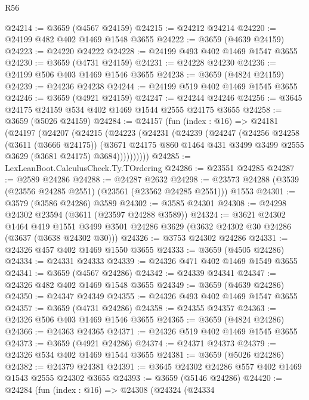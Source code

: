 \begin{lexlean}{R56}
\begin{coremodule}
@24214 := @3659 (@4567 @24159)
@24215 := @24212 @24214
@24220 := @24199 @482 @402 @1469 @1548 @3655
@24222 := @3659 (@4639 @24159)
@24223 := @24220 @24222
@24228 := @24199 @493 @402 @1469 @1547 @3655
@24230 := @3659 (@4731 @24159)
@24231 := @24228 @24230
@24236 := @24199 @506 @403 @1469 @1546 @3655
@24238 := @3659 (@4824 @24159)
@24239 := @24236 @24238
@24244 := @24199 @519 @402 @1469 @1545 @3655
@24246 := @3659 (@4921 @24159)
@24247 := @24244 @24246
@24256 := @3645 @24175 @24159 @534 @402 @1469 @1544 @2555 @24175 @3655
@24258 := @3659 (@5026 @24159)
@24284 := @24157
    (fun (index : @16) =>
    @24181
      (@24197
        (@24207
          (@24215
            (@24223
              (@24231
                (@24239
                  (@24247
                    (@24256
                      @24258
                      (@3611 (@3666 @24175))
                      (@3671
                        @24175
                        @860
                        @1464
                        @431
                        @3499
                        @3499
                        @2555
                        @3629
                        (@3681 @24175)
                        @3684))))))))))
@24285 := LexLeanBoot.CalculusCheck.Ty.TOrdering
@24286 := @23551 @24285
@24287 := @2589 @24286
@24288 := @24287 @2632
@24298 := @23573 @24288 (@3539 (@23556 @24285 @2551) (@23561 (@23562 @24285 @2551))) @1553
@24301 := @3579 (@3586 @24286) @3589
@24302 := @3585 @24301
@24308 := @24298 @24302 @23594 (@3611 (@23597 @24288 @3589))
@24324 := @3621
    @24302
    @1464
    @419
    @1551
    @3499
    @3501
    @24286
    @3629
    (@3632 @24302 @30 @24286 (@3637 (@3638 @24302 @30)))
@24326 := @3753 @24302 @24286
@24331 := @24326 @457 @402 @1469 @1550 @3655
@24333 := @3659 (@4505 @24286)
@24334 := @24331 @24333
@24339 := @24326 @471 @402 @1469 @1549 @3655
@24341 := @3659 (@4567 @24286)
@24342 := @24339 @24341
@24347 := @24326 @482 @402 @1469 @1548 @3655
@24349 := @3659 (@4639 @24286)
@24350 := @24347 @24349
@24355 := @24326 @493 @402 @1469 @1547 @3655
@24357 := @3659 (@4731 @24286)
@24358 := @24355 @24357
@24363 := @24326 @506 @403 @1469 @1546 @3655
@24365 := @3659 (@4824 @24286)
@24366 := @24363 @24365
@24371 := @24326 @519 @402 @1469 @1545 @3655
@24373 := @3659 (@4921 @24286)
@24374 := @24371 @24373
@24379 := @24326 @534 @402 @1469 @1544 @3655
@24381 := @3659 (@5026 @24286)
@24382 := @24379 @24381
@24391 := @3645 @24302 @24286 @557 @402 @1469 @1543 @2555 @24302 @3655
@24393 := @3659 (@5146 @24286)
@24420 := @24284
    (fun (index : @16) =>
    @24308
      (@24324
        (@24334

\end{coremodule}
\end{lexlean}
